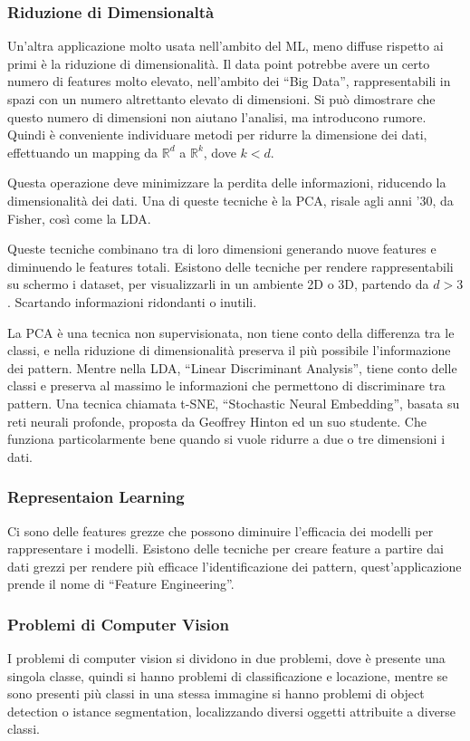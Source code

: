 \documentclass{article}
\numberwithin{equation}{subsection}
\begin{document}
\subsubsection{Riduzione di Dimensionaltà}

Un'altra applicazione molto usata nell'ambito del ML, meno diffuse rispetto ai primi è la 
riduzione di dimensionalità. Il data point potrebbe avere un certo numero di features molto 
elevato, nell'ambito dei ``Big Data'', rappresentabili in spazi con un numero altrettanto 
elevato di dimensioni. Si può dimostrare che questo numero di dimensioni non aiutano l'analisi, ma introducono rumore. Quindi è conveniente individuare metodi per ridurre la dimensione dei dati, effettuando un mapping da $\mathbb{R}^d$ a $\mathbb{R}^k$, dove 
$k<d$. 

Questa operazione deve minimizzare la perdita delle informazioni, riducendo la dimensionalità dei dati. 
Una di queste tecniche è la PCA, risale agli anni '30, da Fisher, così come la LDA. 

Queste tecniche combinano tra di loro dimensioni generando nuove features e diminuendo 
le features totali. Esistono delle tecniche per rendere rappresentabili su schermo 
i dataset, per visualizzarli in un ambiente 2D o 3D, partendo da $d>3$. Scartando informazioni ridondanti o inutili. 

La PCA è una tecnica non supervisionata, non tiene conto della differenza tra le classi, e nella riduzione di dimensionalità preserva il più possibile l'informazione dei pattern. Mentre nella LDA, ``Linear Discriminant Analysis'', tiene conto delle classi e preserva al 
massimo le informazioni che permettono di discriminare tra pattern. 
Una tecnica chiamata t-SNE, ``Stochastic Neural Embedding'', basata su reti neurali profonde, proposta da Geoffrey Hinton ed un suo studente. Che funziona particolarmente bene quando si vuole ridurre a due o tre dimensioni i dati. 

\subsubsection{Representaion Learning}

Ci sono delle features grezze che possono diminuire l'efficacia dei modelli per rappresentare i modelli. Esistono delle tecniche per creare feature a partire dai dati grezzi per rendere più efficace l'identificazione dei pattern, quest'applicazione prende il nome di ``Feature Engineering''. 

\subsubsection{Problemi di Computer Vision}

I problemi di computer vision si dividono in due problemi, dove è presente una singola 
classe, quindi si hanno problemi di classificazione e locazione, mentre se sono presenti più classi in una stessa immagine si hanno problemi di object detection o istance segmentation, localizzando diversi oggetti attribuite a diverse classi. 
\end{document}
